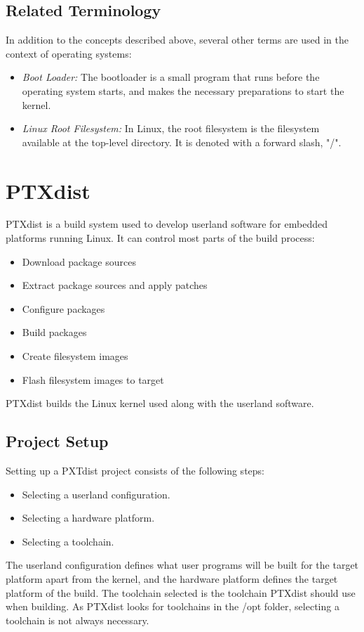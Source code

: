 \subsection{Related Terminology}
In addition to the concepts described above, several other terms are used in the context of operating systems:
\begin{itemize}
\item \textsl{Boot Loader:} The bootloader is a small program that runs before the operating system starts, and makes the necessary preparations to start the kernel.
\item \textsl{Linux Root Filesystem:} In Linux, the root filesystem is the filesystem available at the top-level directory. It is denoted with a forward slash, "/".
\end{itemize}



\section{PTXdist}
PTXdist is a build system used to develop userland software for embedded platforms running Linux. It can control most parts of the build process:
\begin{itemize}
  \item Download package sources
  \item Extract package sources and apply patches
  \item Configure packages
  \item Build packages
  \item Create filesystem images
  \item Flash filesystem images to target
\end{itemize}
PTXdist builds the Linux kernel used along with the userland software.

\subsection{Project Setup}
Setting up a PXTdist project consists of the following steps:
\begin{itemize}
  \item Selecting a userland configuration.
  \item Selecting a hardware platform.
  \item Selecting a toolchain.
\end{itemize}
The userland configuration defines what user programs will be built for the target platform apart from the kernel, and the hardware platform defines the target platform of the build. The toolchain selected is the toolchain PTXdist should use when building. As PTXdist looks for toolchains in the /opt folder, selecting a toolchain is not always necessary.

